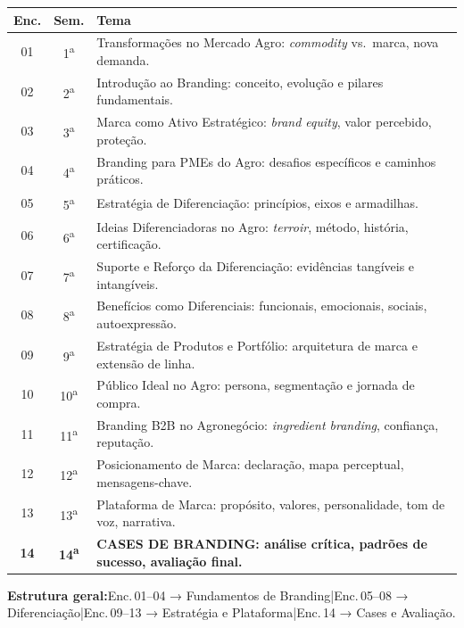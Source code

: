 \documentclass[11pt,a4paper]{article}
\begin{document}
\begin{small}
\renewcommand{\arraystretch}{1.35}
\begin{tabularx}{\textwidth}{@{}c c X@{}}
\toprule
\textbf{Enc.} & \textbf{Sem.} & \textbf{Tema} \\
\midrule
01 & 1\textsuperscript{a} & Transformações no Mercado Agro: \textit{commodity} vs.\ marca, nova demanda. \\
02 & 2\textsuperscript{a} & Introdução ao Branding: conceito, evolução e pilares fundamentais. \\
03 & 3\textsuperscript{a} & Marca como Ativo Estratégico: \textit{brand equity}, valor percebido, proteção. \\
04 & 4\textsuperscript{a} & Branding para PMEs do Agro: desafios específicos e caminhos práticos. \\
05 & 5\textsuperscript{a} & Estratégia de Diferenciação: princípios, eixos e armadilhas. \\
06 & 6\textsuperscript{a} & Ideias Diferenciadoras no Agro: \textit{terroir}, método, história, certificação. \\
07 & 7\textsuperscript{a} & Suporte e Reforço da Diferenciação: evidências tangíveis e intangíveis. \\
08 & 8\textsuperscript{a} & Benefícios como Diferenciais: funcionais, emocionais, sociais, autoexpressão. \\
09 & 9\textsuperscript{a} & Estratégia de Produtos e Portfólio: arquitetura de marca e extensão de linha. \\
10 & 10\textsuperscript{a} & Público Ideal no Agro: persona, segmentação e jornada de compra. \\
11 & 11\textsuperscript{a} & Branding B2B no Agronegócio: \textit{ingredient branding}, confiança, reputação. \\
12 & 12\textsuperscript{a} & Posicionamento de Marca: declaração, mapa perceptual, mensagens-chave. \\
13 & 13\textsuperscript{a} & Plataforma de Marca: propósito, valores, personalidade, tom de voz, narrativa. \\
\rowcolor{uefslight!70!white}
\textbf{14} & \textbf{14\textsuperscript{a}} & \textbf{\textsf{CASES DE BRANDING}: análise crítica, padrões de sucesso, avaliação final.} \\
\bottomrule
\end{tabularx}
\end{small}

\begin{tcolorbox}[uefsbox]
\textbf{Estrutura geral:}\enspace Enc.\,01--04 → Fundamentos de Branding\enspace|\enspace Enc.\,05--08 → Diferenciação\enspace|\enspace Enc.\,09--13 → Estratégia e Plataforma\enspace|\enspace Enc.\,14 → Cases e Avaliação.
\end{tcolorbox}
\end{document}
